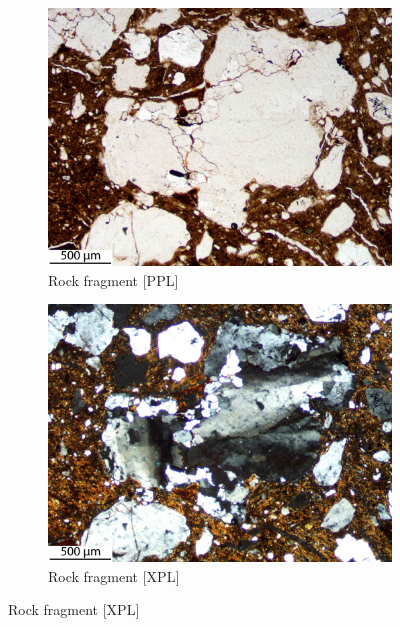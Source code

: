 \documentclass[a4paper]{article}
\begin{document}
\begin{figure}[H]
\begin{subfigure}[t]{.24\textwidth}
		\includegraphics[width=\textwidth]{ThinSections/6-5_4x_PPL.jpg}
		\caption{Rock fragment [PPL]}
	\end{subfigure}\hspace{.1em}\hfill
	\begin{subfigure}[t]{.24\textwidth}
		\includegraphics[width=\textwidth]{ThinSections/6-5_4x_XPL.jpg}
		\caption{Rock fragment [XPL]}
	\end{subfigure}

\end{figure}
\end{document}
